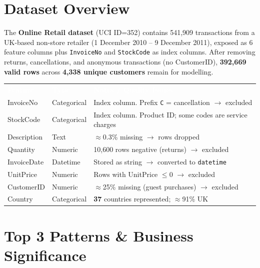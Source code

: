 \documentclass[12pt, a4paper]{article}
\newcommand{\thead}[1]{\textcolor{white}{\textbf{#1}}}
\begin{document}
\vspace{4pt}

\section{Dataset Overview}

The \textbf{Online Retail dataset} (UCI ID=352) contains 541,909 transactions from a UK-based
non-store retailer (1 December 2010 -- 9 December 2011), exposed as 6 feature columns plus
\texttt{InvoiceNo} and \texttt{StockCode} as index columns. After removing returns,
cancellations, and anonymous transactions (no CustomerID), \textbf{392,669 valid rows} across
\textbf{4,338 unique customers} remain for modelling.

\vspace{6pt}
\renewcommand{\arraystretch}{1.15}
\begin{tabularx}{\linewidth}{L{2.8cm} L{2.3cm} Y}
\thead{Feature} & \thead{Type} & \thead{Notes / Quality Issues} \\
InvoiceNo      & Categorical & Index column. Prefix \texttt{C} = cancellation $\to$ excluded \\
StockCode      & Categorical & Index column. Product ID; some codes are service charges \\
Description    & Text        & $\approx$0.3\% missing $\to$ rows dropped \\
Quantity       & Numeric     & 10,600 rows negative (returns) $\to$ excluded \\
InvoiceDate    & Datetime    & Stored as string $\to$ converted to \texttt{datetime} \\
UnitPrice      & Numeric     & Rows with UnitPrice $\leq 0$ $\to$ excluded \\
CustomerID     & Numeric     & $\approx$25\% missing (guest purchases) $\to$ excluded \\
Country        & Categorical & \textbf{37} countries represented; $\approx$91\% UK \\
\end{tabularx}

\section{Top 3 Patterns \& Business Significance}
\end{document}
